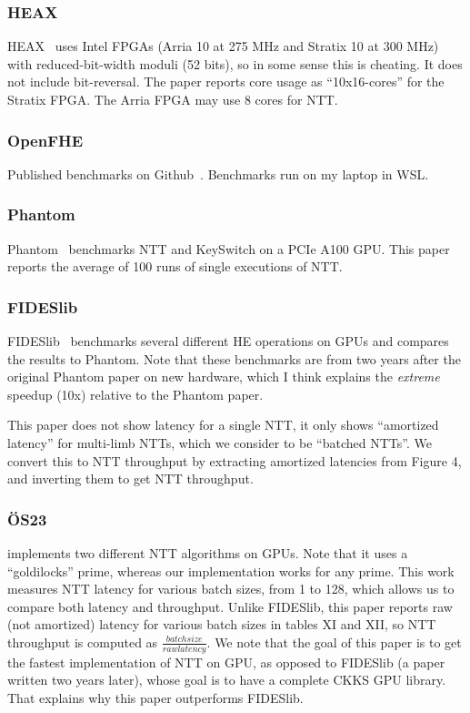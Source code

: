 \documentclass{article}
\begin{document}
	\subsubsection{HEAX}
	HEAX~\cite{riazi2020heaxarchitecturecomputingencrypted} uses Intel FPGAs (Arria 10 at 275 MHz and Stratix 10 at 300 MHz) with reduced-bit-width moduli (52 bits), so in some sense this is cheating. It does not include bit-reversal. The paper reports core usage as ``10x16-cores'' for the Stratix FPGA. The Arria FPGA may use 8 cores for NTT.
	
	\subsubsection{OpenFHE}
	Published benchmarks on Github~\cite{OpenFHE}. Benchmarks run on my laptop in WSL.
	
	\subsubsection{Phantom}
	Phantom~\cite{cryptoeprint:2023/049} benchmarks NTT and KeySwitch on a PCIe A100 GPU. This paper reports the average of 100 runs of single executions of NTT.
	
	\subsubsection{FIDESlib}
	FIDESlib~\cite{agullódomingo2025fideslibfullyfledgedopensourcefhe} benchmarks several different HE operations on GPUs and compares the results to Phantom. Note that these benchmarks are from two years after the original Phantom paper on new hardware, which I think explains the \emph{extreme} speedup (10x) relative to the Phantom paper.
	
	This paper does not show latency for a single NTT, it only shows ``amortized latency'' for multi-limb NTTs, which we consider to be ``batched NTTs''. We convert this to NTT throughput by extracting amortized latencies from Figure 4, and inverting them to get NTT throughput.
	
	\subsubsection{ÖS23}
	\cite{cryptoeprint:2023/1410} implements two different NTT algorithms on GPUs. Note that it uses a ``goldilocks'' prime, whereas our implementation works for any prime. This work measures NTT latency for various batch sizes, from 1 to 128, which allows us to compare both latency and throughput. Unlike FIDESlib, this paper reports raw (not amortized) latency for various batch sizes in tables XI and XII, so NTT throughput is computed as $\frac{batch size}{raw latency}$. We note that the goal of this paper is to get the fastest implementation of NTT on GPU, as opposed to FIDESlib (a paper written two years later), whose goal is to have a complete CKKS GPU library. That explains why this paper outperforms FIDESlib.
	
\end{document}
